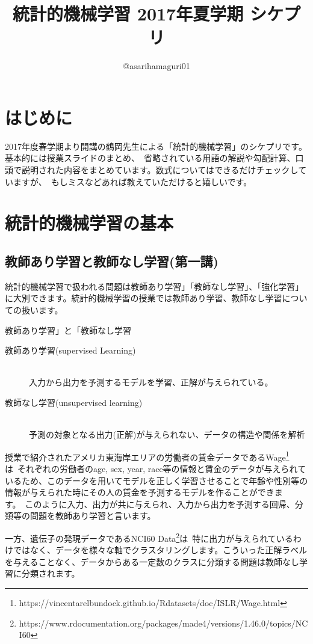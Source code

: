 \documentclass[uplatex]{jsarticle}
\title{統計的機械学習 2017年夏学期 シケプリ}
\author{@asarihamaguri01}
\begin{document}
\maketitle

\section{はじめに}
2017年度春学期より開講の鶴岡先生による「統計的機械学習」のシケプリです。基本的には授業スライドのまとめ、\
省略されている用語の解説や勾配計算、口頭で説明された内容をまとめています。数式についてはできるだけチェックしていますが、\
もしミスなどあれば教えていただけると嬉しいです。



\section{統計的機械学習の基本}
\subsection{教師あり学習と教師なし学習(第一講)}
統計的機械学習で扱われる問題は教師あり学習」「教師なし学習」、「強化学習」に大別できます。統計的機械学習の授業では教師あり学習、教師なし学習についての扱います。

\begin{itembox}[l]{教師あり学習」と「教師なし学習}
  \begin{description}
    \item [教師あり学習(supervised Learning)]\mbox{}\\
    入力から出力を予測するモデルを学習、正解が与えられている。
    \item [教師なし学習(unsupervised learning)]\mbox{}\\
    予測の対象となる出力(正解)が与えられない、データの構造や関係を解析
  \end{description}
\end{itembox}

授業で紹介されたアメリカ東海岸エリアの労働者の賃金データであるWage\footnote{https://vincentarelbundock.github.io/Rdatasets/doc/ISLR/Wage.html}は\
それぞれの労働者のage, sex, year, race等の情報と賃金のデータが与えられているため、このデータを用いてモデルを正しく学習させることで年齢や性別等の情報が与えられた時にその人の賃金を予測するモデルを作ることができます。\
このように入力、出力が共に与えられ、入力から出力を予測する回帰、分類等の問題を教師あり学習と言います。

一方、遺伝子の発現データであるNCI60 Data\footnote{https://www.rdocumentation.org/packages/made4/versions/1.46.0/topics/NCI60}は\
特に出力が与えられているわけではなく、データを様々な軸でクラスタリングします。こういった正解ラベルを与えることなく、データからある一定数のクラスに分類する問題は教師なし学習に分類されます。
\end{document}

